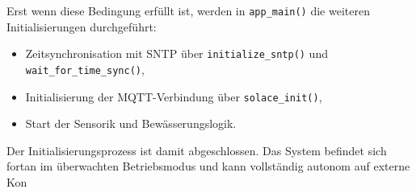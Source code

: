 Erst wenn diese Bedingung erfüllt ist, werden in \texttt{app\_main()} die weiteren Initialisierungen durchgeführt:
\begin{itemize}
	\item Zeitsynchronisation mit SNTP über \texttt{initialize\_sntp()} und \texttt{wait\_for\_time\_sync()},
	\item Initialisierung der MQTT-Verbindung über \texttt{solace\_init()},
	\item Start der Sensorik und Bewässerungslogik.
\end{itemize}

\noindent Der Initialisierungsprozess ist damit abgeschlossen. Das System befindet sich fortan im überwachten Betriebsmodus und kann vollständig autonom auf externe Kon
